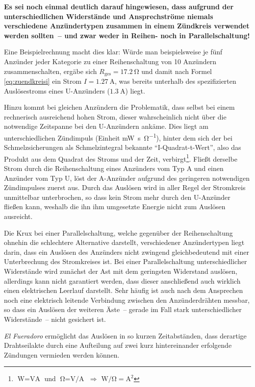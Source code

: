 \documentclass[paper=a4, parskip, numbers=noenddot, toc=listof, headsepline]{scrbook}
\newcommand{\anlage}{\emph{El Fueradoro}}
\begin{document}
					\textbf{Es sei noch einmal deutlich darauf hingewiesen, dass aufgrund der unterschiedlichen Widerstände und Ansprechströme niemals verschiedene Anzündertypen zusammen in einem Zündkreis verwendet werden sollten~-- und zwar weder in Reihen- noch in Parallelschaltung!}

					Eine Beispielrechnung macht dies klar: Würde man beispielsweise je fünf Anzünder jeder Kategorie zu einer Reihenschaltung von 10 Anzündern zusammenschalten, ergäbe sich $R_\text{ges} = \SI{17,2}{\ohm}$ und damit nach Formel \eqref{eq:zuendkreisi} ein Strom $I = \SI{1,27}{\ampere}$, was bereits unterhalb des spezifizierten Auslösestroms eines U-Anzünders ($\SI{1,3}{\ampere}$) liegt.

					Hinzu kommt bei gleichen Anzündern die Problematik, dass selbst bei einem rechnerisch ausreichend hohen Strom, dieser wahrscheinlich nicht über die notwendige Zeitspanne bei den U-Anzündern ankäme. Dies liegt am unterschiedlichen Zündimpuls (Einheit \si{\milli\watt\second\per\ohm}), hinter dem sich der bei Schmelzsicherungen als Schmelzintegral bekannte \enquote{I-Quadrat-t-Wert}, also das Produkt aus dem Quadrat des Stroms und der Zeit, verbirgt\footnote{$\si{\watt} = \si{\volt\ampere}$ und $\si{\ohm} = \si{\volt\per\ampere}$ $\Rightarrow$ $\si{\watt\per\ohm} = \si{\square\ampere}$}. Fließt derselbe Strom durch die Reihenschaltung eines Anzünders vom Typ A und einen Anzünder vom Typ U, löst der A-Anzünder aufgrund des geringeren notwendigen Zündimpulses zuerst aus. Durch das Auslösen wird in aller Regel der Stromkreis unmittelbar unterbrochen, so dass kein Strom mehr durch den U-Anzünder fließen kann, weshalb die ihn ihm umgesetzte Energie nicht zum Auslösen ausreicht.

					Die Krux bei einer Parallelschaltung, welche gegenüber der Reihenschaltung ohnehin die schlechtere Alternative darstellt, verschiedener Anzündertypen liegt darin, dass ein Auslösen des Anzünders nicht zwingend gleichbedeutend mit einer Unterbrechung des Stromkreises ist. Bei einer Parallelschaltung unterschiedlicher Widerstände wird zunächst der Ast mit dem geringsten Widerstand auslösen, allerdings kann nicht garantiert werden, dass dieser anschließend auch wirklich einen elektrischen Leerlauf darstellt. Sehr häufig ist auch nach dem Ansprechen noch eine elektrisch leitende Verbindung zwischen den Anzünderdrähten messbar, so dass ein Auslösen der weiteren Äste~-- gerade im Fall stark unterschiedlicher Widerstände~-- nicht gesichert ist.

					{\anlage} ermöglicht das Auslösen in so kurzen Zeitabständen, dass derartige Drahtseilakte durch eine Aufteilung auf zwei kurz hintereinander erfolgende Zündungen vermieden werden können.
\end{document}
